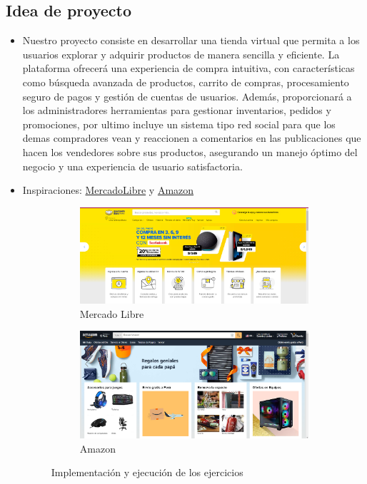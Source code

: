 \documentclass{article}
\begin{document}
	\subsection{Idea de proyecto}
	\begin{itemize}	
                \item Nuestro proyecto consiste en desarrollar una tienda virtual que permita a los usuarios explorar y adquirir productos de manera sencilla y eficiente. La plataforma ofrecerá una experiencia de compra intuitiva, con características como búsqueda avanzada de productos, carrito de compras, procesamiento seguro de pagos y gestión de cuentas de usuarios. Además, proporcionará a los administradores herramientas para gestionar inventarios, pedidos y promociones, por ultimo incluye un sistema tipo red social para que los demas compradores vean y reaccionen a comentarios en las publicaciones que hacen los vendedores sobre sus productos, asegurando un manejo óptimo del negocio y una experiencia de usuario satisfactoria.

                \item Inspiraciones: \href{https://www.mercadolibre.com}{MercadoLibre} y \href{https://www.amazon.com}{Amazon}
\begin{figure}[h]
    \centering
    \begin{subfigure}[b]{0.45\linewidth}
        \includegraphics[width=\linewidth]{img/ins1.png}
        \caption{Mercado Libre}
        \label{fig:ejercicioA}
    \end{subfigure}
    \hfill
    \begin{subfigure}[b]{0.45\linewidth}
        \includegraphics[width=\linewidth]{img/ins2.png}
        \caption{Amazon}
        \label{fig:ejercicioB}
    \end{subfigure}
    \caption{Implementación y ejecución de los ejercicios}
    \label{fig:ejercicios}
\end{figure}
	\end{itemize}	
\end{document}
